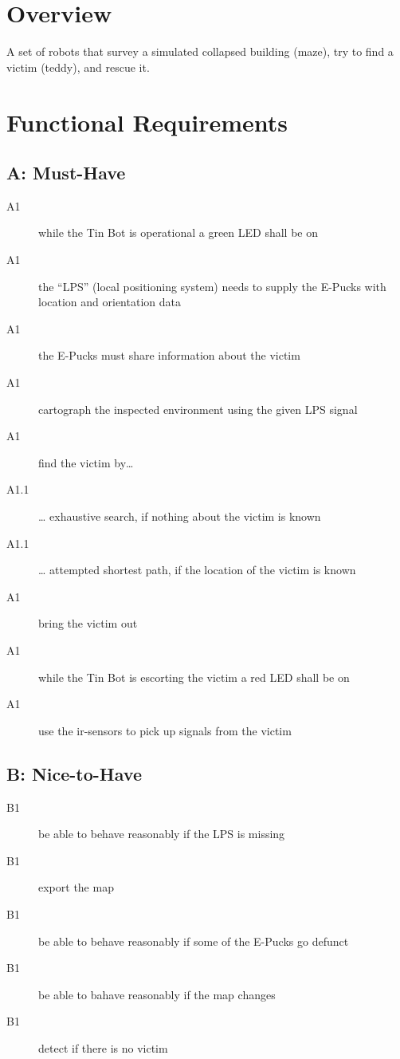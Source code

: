 \documentclass[a4paper,parskip,headheight=38pt]{scrartcl} %
\begin{document}
\section{Overview}
A set of robots that survey a simulated collapsed building (maze), try to find a victim (teddy), and rescue it.

\section{Functional Requirements}
\subsection*{A: Must-Have}
\begin{description}
\item[A1] while the Tin Bot is operational a green LED shall be on
\item[A1] the \enquote{LPS} (local positioning system) needs to supply the E-Pucks with location and orientation data
\item[A1] the E-Pucks must share information about the victim
\item[A1] cartograph the inspected environment using the given LPS signal
\item[A1] find the victim by…
\item[A1.1] … exhaustive search, if nothing about the victim is known
\item[A1.1] … attempted shortest path, if the location of the victim is known
\item[A1] bring the victim out
\item[A1] while the Tin Bot is escorting the victim a red LED shall be on
\item[A1] use the ir-sensors to pick up signals from the victim
\end{description}

\subsection*{B: Nice-to-Have}
\begin{description}
\item[B1] be able to behave reasonably if the LPS is missing
\item[B1] export the map
\item[B1] be able to behave reasonably if some of the E-Pucks go defunct
\item[B1] be able to bahave reasonably if the map changes
\item[B1] detect if there is no victim
\end{description}
\end{document}

